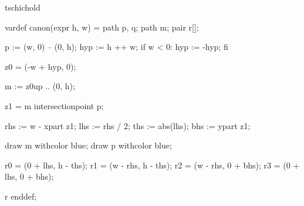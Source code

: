 


\startenvironment tschichold

	\startMPdefinitions
		vardef canon(expr h, w) =
			path p, q;
			path m;
			pair r[];

			p := (w, 0) -- (0, h); %
			hyp := h ++ w; %
			if w < 0:
				hyp := -hyp;
			fi

			z0 = (-w + hyp, 0); %

			m := z0{up} .. (0, h);

			z1 = m intersectionpoint p;

			rhs := w - xpart z1;
			lhs := rhs / 2;
			ths := abs(lhs); %
			bhs := ypart z1;

			draw m withcolor blue;
			draw p withcolor blue;

			r0 = (0 + lhs, h - ths); %
			r1 = (w - rhs, h - ths); %
			r2 = (w - rhs, 0 + bhs); %
			r3 = (0 + lhs, 0 + bhs); %

			r
		enddef;
	\stopMPdefinitions

\stopenvironment


